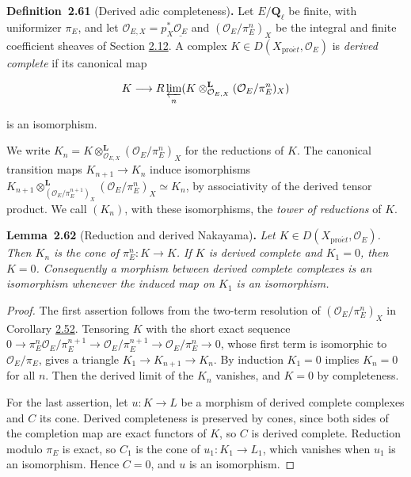 \documentclass[11pt]{article}
\newenvironment{bpstatement}[2]{\par\addvspace{0.6\baselineskip}\noindent\textbf{#1}#2\textbf{.}\enspace\ignorespaces}
  {\par\addvspace{0.4\baselineskip}}
\newenvironment{bpstatementit}[2]{\begin{bpstatement}{#1}{#2}\itshape\ignorespaces}{\end{bpstatement}}
\begin{document}
\label{bp188}%
\begin{bpstatement}{Definition~2.61}{ (Derived adic completeness)}
Let \(E/\mathbf Q_\ell\) be finite, with uniformizer \(\pi_E\), and let \(\mathcal O_{E,X}=p_X^*\underline{\mathcal O_E}\) and \((\mathcal O_E/\pi_E^n)_X\) be the integral and finite coefficient sheaves of Section \hyperref[bp149]{2.12}. A complex \(K\in D(X_{\mathrm{pro}\acute{e}t},\mathcal O_E)\) is \emph{derived complete} if its canonical map

\[
K\longrightarrow R\varprojlim_n
(K\otimes^{\mathbf L}_{\mathcal O_{E,X}}(\mathcal O_E/\pi_E^{n})_X)
\]

is an isomorphism.
\end{bpstatement}

\label{bp189}%
We write \(K_n=K\otimes^{\mathbf L}_{\mathcal O_{E,X}}(\mathcal O_E/\pi_E^{n})_X\) for the reductions of \(K\). The canonical transition maps \(K_{n+1}\to K_n\) induce isomorphisms \(K_{n+1}\otimes^{\mathbf L}_{(\mathcal O_E/\pi_E^{n+1})_X}(\mathcal O_E/\pi_E^{n})_X\simeq K_n\), by associativity of the derived tensor product. We call \((K_n)\), with these isomorphisms, the \emph{tower of reductions} of \(K\).

\label{bp190}%
\begin{bpstatementit}{Lemma~2.62}{ (Reduction and derived Nakayama)}
Let \(K\in D(X_{\mathrm{pro}\acute{e}t},\mathcal O_E)\). Then \(K_n\) is the cone of \(\pi_E^n:K\to K\). If \(K\) is derived complete and \(K_1=0\), then \(K=0\). Consequently a morphism between derived complete complexes is an isomorphism whenever the induced map on \(K_1\) is an isomorphism.
\end{bpstatementit}

\begin{proof}[{Proof}]\label{bp191}%
The first assertion follows from the two-term resolution of \((\mathcal O_E/\pi_E^n)_X\) in Corollary \hyperref[bp161]{2.52}. Tensoring \(K\) with the short exact sequence \(0\to\pi_E^n\mathcal O_E/\pi_E^{n+1}\to\mathcal O_E/\pi_E^{n+1}\to
\mathcal O_E/\pi_E^n\to0\), whose first term is isomorphic to \(\mathcal O_E/\pi_E\), gives a triangle \(K_1\to K_{n+1}\to K_n\). By induction \(K_1=0\) implies \(K_n=0\) for all \(n\). Then the derived limit of the \(K_n\) vanishes, and \(K=0\) by completeness.

For the last assertion, let \(u:K\to L\) be a morphism of derived complete complexes and \(C\) its cone. Derived completeness is preserved by cones, since both sides of the completion map are exact functors of \(K\), so \(C\) is derived complete. Reduction modulo \(\pi_E\) is exact, so \(C_1\) is the cone of \(u_1:K_1\to L_1\), which vanishes when \(u_1\) is an isomorphism. Hence \(C=0\), and \(u\) is an isomorphism.
\end{proof}
\end{document}
